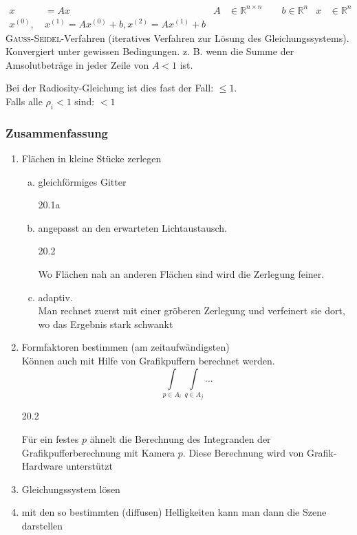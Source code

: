 \begin{align*}
 x &= Ax & A &\in \mathbb{R}^{n \times n} \qquad b \in \mathbb{R}^n
	 & x &\in \mathbb{R}^n\\
 x^{(0)}{,}\ & x^{(1)} = A x^{(0)} + b, x^{(2)} = Ax^{(1)} + b
\end{align*}
\textsc{Gauß-Seidel}-Verfahren (iteratives Verfahren zur Lösung des Gleichungssystems). Konvergiert unter gewissen
Bedingungen. z. B. wenn die Summe der Amsolutbeträge in jeder Zeile von $A < 1$ ist.

Bei der Radiosity-Gleichung ist dies fast der Fall: $\le 1$.\\

Falls alle $\rho_i < 1$ sind: $< 1$

\subsubsection{Zusammenfassung}
\begin{enumerate}
 \item Flächen in kleine Stücke zerlegen
	\begin{enumerate}[a)]
	 \item gleichförmiges Gitter
		\begin{center}
		 20.1a
		\end{center}
	 \item angepasst an den erwarteten Lichtaustausch.
		\begin{center}
		 20.2
		\end{center}
		Wo Flächen nah an anderen Flächen sind wird die Zerlegung feiner.
	 \item adaptiv.\\
		Man rechnet zuerst mit einer gröberen Zerlegung und verfeinert sie dort, wo das Ergebnis
		stark schwankt
	\end{enumerate}
 \item Formfaktoren bestimmen (am zeitaufwändigsten)\\
	Können auch mit Hilfe von Grafikpuffern berechnet werden.
	\[\int\limits_{p \in A_i} \int\limits_{q \in A_j} ...\]
	\begin{center}
	 20.2
	\end{center}
	Für ein festes $p$ ähnelt die Berechnung des Integranden der Grafikpufferberechnung mit Kamera $p$. Diese
	Berechnung wird von Grafik-Hardware unterstützt
 \item Gleichungssystem lösen
 \item mit den so bestimmten (diffusen) Helligkeiten kann man dann die Szene darstellen
\end{enumerate}

